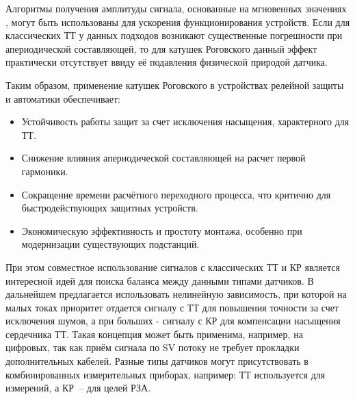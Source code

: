 Алгоритмы получения амплитуды сигнала, основанные на мгновенных значениях \cite{bavr_bib_022_s_2020}, могут быть использованы для ускорения функционирования устройств. Если для классических ТТ у данных подходов возникают существенные погрешности при апериодической составляющей, то для катушек Роговского данный эффект практически отсутствует ввиду её подавления физической природой датчика.

Таким образом, применение катушек Роговского в устройствах релейной защиты и автоматики обеспечивает:
\begin{itemize}[noitemsep,topsep=2pt]
\item Устойчивость работы защит за счет исключения насыщения, характерного для ТТ.
\item Снижение влияния апериодической составляющей на расчет первой гармоники.
\item Сокращение времени расчётного переходного процесса, что критично для быстродействующих защитных устройств.
\item Экономическую эффективность и простоту монтажа, особенно при модернизации существующих подстанций.
\end{itemize}

При этом совместное использование сигналов с классических ТТ и КР является интересной
идей для поиска баланса между данными типами датчиков. В дальнейшем предлагается
использовать нелинейную зависимость, при которой на малых токах приоритет отдается
сигналу с ТТ для повышения точности за счет исключения шумов, а при больших - сигналу с
КР для компенсации насыщения сердечника ТТ. Такая концепция может быть применима,
например, на цифровых, так как приём сигнала по SV потоку не требует прокладки
дополнительных кабелей. Разные типы датчиков могут присутствовать в комбинированных
измерительных приборах, например: ТТ используется для измерений, а КР~-- для целей РЗА.
